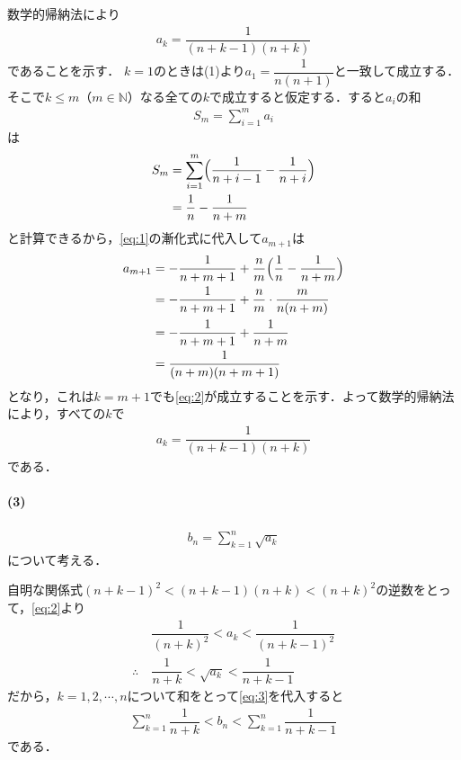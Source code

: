 \documentclass[../../main.tex]{subfiles}
\begin{document}
数学的帰納法により
\begin{align}
  a_k=\dfrac{1}{(n+k-1)(n+k)} \label{eq:2}
\end{align}
であることを示す．
$k=1$のときは(1)より$a_1=\dfrac{1}{n(n+1)}$と一致して成立する．
そこで$k\le m$（$m\in\mathbb N$）なる全ての$k$で成立すると仮定する．すると$a_i$の和
\begin{align}
  S_m=\displaystyle\sum_{i=1}^ma_i
\end{align}
は
\begin{align}
  S_m
  &=\sum_{i=1}^m\Bigl(\dfrac{1}{n+i-1}-\dfrac{1}{n+i}\Bigr) \\
  &=\dfrac{1}{n}-\dfrac{1}{n+m}
\end{align}
と計算できるから，\cref{eq:1}の漸化式に代入して$a_{m+1}$は
\begin{align}
  a_{m+1}
  &=-\dfrac{1}{n+m+1}+\dfrac{n}{m}\Bigl(\dfrac{1}{n}-\dfrac{1}{n+m}\Bigr) \\
  &=-\dfrac{1}{n+m+1}+\dfrac{n}{m}\cdot\dfrac{m}{n(n+m)} \\
  &=-\dfrac{1}{n+m+1}+\dfrac{1}{n+m} \\
  &=\dfrac{1}{(n+m)(n+m+1)}
\end{align}
となり，これは$k=m+1$でも\cref{eq:2}が成立することを示す．よって数学的帰納法により，すべての$k$で
\begin{align}
  a_k=\dfrac{1}{(n+k-1)(n+k)}
\end{align}
である．

\paragraph{(3)}

\begin{align}
  b_n=\displaystyle\sum_{k=1}^n\sqrt{a_k} \label{eq:3}
\end{align}
について考える．

自明な関係式$(n+k-1)^2<(n+k-1)(n+k)<(n+k)^2$の逆数をとって，\cref{eq:2}より
\begin{align}
  &\dfrac{1}{(n+k)^2}<a_k<\dfrac{1}{(n+k-1)^2} \\
  \therefore\
  &\dfrac{1}{n+k}<\sqrt{a_k}<\dfrac{1}{n+k-1} \label{eq:4}
\end{align}
だから，$k=1,2,\cdots,n$について和をとって\cref{eq:3}を代入すると
\begin{align}
  \sum_{k=1}^n\dfrac{1}{n+k}<b_n<\sum_{k=1}^n\dfrac{1}{n+k-1} \label{eq:5}
\end{align}
である．
\end{document}
